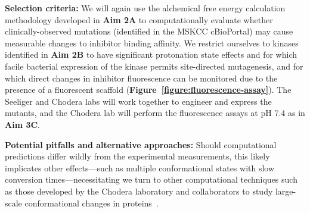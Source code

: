 \documentclass[11pt]{article}
\begin{document}
{{{\bf Selection criteria:}
We will again use the alchemical free energy calculation methodology developed in {\bf Aim 2A} to computationally evaluate whether clinically-observed mutations (identified in the MSKCC cBioPortal) may cause measurable changes to inhibitor binding affinity.
We restrict ourselves to kinases identified in {\bf Aim 2B} to have significant protonation state effects and for which facile bacterial expression of the kinase permits site-directed mutagenesis, and for which direct changes in inhibitor fluorescence can be monitored due to the presence of a fluorescent scaffold ({\bf Figure~\ref{figure:fluorescence-assay}}).
The Seeliger and Chodera labs will work together to engineer and express the mutants, and the Chodera lab will perform the fluorescence assays at pH 7.4 as in {\bf Aim 3C}.

{\bf Potential pitfalls and alternative approaches:} 
Should computational predictions differ wildly from the experimental measurements, this likely implicates other effects---such as multiple conformational states with slow conversion times---necessitating we turn to other computational techniques such as those developed by the Chodera laboratory and collaborators to study large-scale conformational changes in proteins~\cite{noe:jcp:2011:msm-review}.

%

\eject


}}
\end{document}
